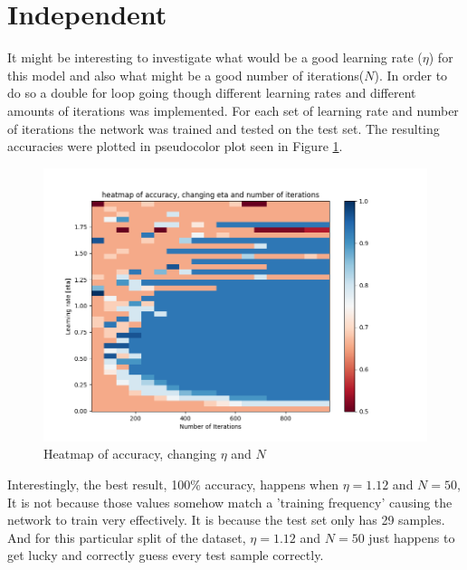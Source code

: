 \documentclass{article}
\begin{document}
\section*{Independent}
It might be interesting to investigate what would be a good learning rate (\(\eta\)) for this model and also what might be a good number of iterations(\(N\)). In order to do so a double for loop going though different learning rates and different amounts of iterations was implemented. For each set of learning rate and number of iterations the network was trained and tested on the test set. The resulting accuracies were plotted in pseudocolor plot seen in Figure \ref{fig:indep1}.
\begin{figure}[h]
    \centering
    \includegraphics[width=\textwidth]{05_backprop/indep1.png}
    \caption{Heatmap of accuracy, changing \(\eta\) and \(N\)}
    \label{fig:indep1}
\end{figure}
Interestingly, the best result, 100\% accuracy, happens when \(\eta=1.12\) and \(N=50\), It is not because those values somehow match a 'training frequency' causing the network to train very effectively. It is because the test set only has 29 samples. And for this particular split of the dataset, \(\eta=1.12\) and \(N=50\) just happens to get lucky and correctly guess every test sample correctly.
\end{document}
